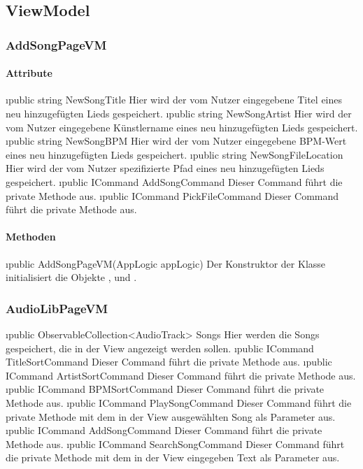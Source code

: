 \documentclass[../entwurf.tex]{subfiles}
\begin{document}
\subsection{ViewModel}
\subsubsection{AddSongPageVM}
\paragraph{Attribute}
\begin{itemize}
	\i{public string NewSongTitle} Hier wird der vom Nutzer eingegebene Titel eines neu hinzugefügten Lieds gespeichert.
	\i{public string NewSongArtist} Hier wird der vom Nutzer eingegebene Künstlername eines neu hinzugefügten Lieds gespeichert.
	\i{public string NewSongBPM} Hier wird der vom Nutzer eingegebene BPM-Wert eines neu hinzugefügten Lieds gespeichert.
	\i{public string NewSongFileLocation} Hier wird der vom Nutzer spezifizierte Pfad eines neu hinzugefügten Lieds gespeichert.
	\i{public ICommand AddSongCommand} Dieser Command führt die private Methode  aus.
	\i{public ICommand PickFileCommand} Dieser Command führt die private Methode  aus.
\end{itemize}
\paragraph{Methoden}
\begin{itemize}
	\i{public AddSongPageVM(AppLogic appLogic)} Der Konstruktor der Klasse initialisiert die Objekte ,  und .
\end{itemize}
\subsubsection{AudioLibPageVM}
\begin{itemize}
	\i{public ObservableCollection<AudioTrack> Songs} Hier werden die Songs gespeichert, die in der View angezeigt werden sollen.
	\i{public ICommand TitleSortCommand} Dieser Command führt die private Methode  aus.
	\i{public ICommand ArtistSortCommand} Dieser Command führt die private Methode  aus.
	\i{public ICommand BPMSortCommand} Dieser Command führt die private Methode  aus.
	\i{public ICommand PlaySongCommand} Dieser Command führt die private Methode  mit dem in der View ausgewählten Song als Parameter aus.
	\i{public ICommand AddSongCommand} Dieser Command führt die private Methode  aus.
	\i{public ICommand SearchSongCommand} Dieser Command führt die private Methode  mit dem in der View eingegeben Text als Parameter aus.
\end{itemize}
\end{document}
